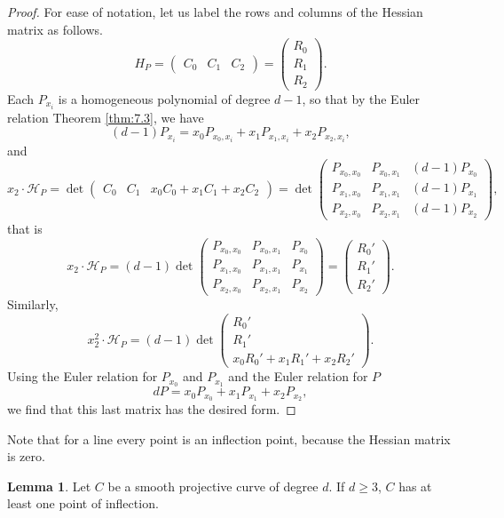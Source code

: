 \documentclass{article}
\newcommand{\rb}[1]{\left( #1 \right)}
\newcommand{\three}[3]{\begin{pmatrix} #1 & #2 & #3 \end{pmatrix}}
\theoremstyle{definition}\newtheorem{definition}{Definition}[section]
\theoremstyle{definition}\newtheorem{notation}[definition]{Notation}
\theoremstyle{definition}\newtheorem{remark}[definition]{Remark}
\theoremstyle{definition}\newtheorem{example}[definition]{Example}
\theoremstyle{definition}\newtheorem{fact}{Fact}
\theoremstyle{definition}\newtheorem{exercise}{Exercise}
\newtheorem{lemma}[definition]{Lemma}
\begin{document}

\begin{proof}
For ease of notation, let us label the rows and columns of the Hessian matrix as follows.
$$ H_P = \three{C_0}{C_1}{C_2} = \begin{pmatrix} R_0 \\ R_1 \\ R_2 \end{pmatrix}. $$
Each $ P_{x_i} $ is a homogeneous polynomial of degree $ d - 1 $, so that by the Euler relation Theorem \ref{thm:7.3}, we have
$$ \rb{d - 1}P_{x_i} = x_0P_{x_0, x_i} + x_1P_{x_1, x_i} + x_2P_{x_2, x_i}, $$
and
$$ x_2 \cdot \mathcal{H}_P = \det\three{C_0}{C_1}{x_0C_0 + x_1C_1 + x_2C_2} = \det\begin{pmatrix} P_{x_0, x_0} & P_{x_0, x_1} & \rb{d - 1}P_{x_0} \\ P_{x_1, x_0} & P_{x_1, x_1} & \rb{d - 1}P_{x_1} \\ P_{x_2, x_0} & P_{x_2, x_1} & \rb{d - 1}P_{x_2} \end{pmatrix}, $$
that is
$$ x_2 \cdot \mathcal{H}_P = \rb{d - 1}\det\begin{pmatrix} P_{x_0, x_0} & P_{x_0, x_1} & P_{x_0} \\ P_{x_1, x_0} & P_{x_1, x_1} & P_{x_1} \\ P_{x_2, x_0} & P_{x_2, x_1} & P_{x_2} \end{pmatrix} = \begin{pmatrix} R_0' \\ R_1' \\ R_2' \end{pmatrix}. $$
Similarly,
$$ x_2^2 \cdot \mathcal{H}_P = \rb{d - 1}\det\begin{pmatrix} R_0' \\ R_1' \\ x_0R_0' + x_1R_1' + x_2R_2' \end{pmatrix}. $$
Using the Euler relation for $ P_{x_0} $ and $ P_{x_1} $ and the Euler relation for $ P $
$$ dP = x_0P_{x_0} + x_1P_{x_1} + x_2P_{x_2}, $$
we find that this last matrix has the desired form.
\end{proof}

Note that for a line every point is an inflection point, because the Hessian matrix is zero.

\begin{lemma}
\label{lem:13.5}
Let $ C $ be a smooth projective curve of degree $ d $. If $ d \ge 3 $, $ C $ has at least one point of inflection.
\end{lemma}
\end{document}
